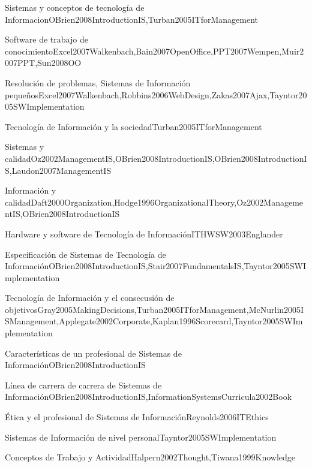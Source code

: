 \begin{LU1}{Sistemas y conceptos de tecnología de Informacion}{OBrien2008IntroductionIS,Turban2005ITforManagement}{}
\begin{LU2}{Software de trabajo de conocimiento}{Excel2007Walkenbach,Bain2007OpenOffice,PPT2007Wempen,Muir2007PPT,Sun2008OO}{}
\begin{LU3}{Resolución de problemas, Sistemas de Información pequeños}{Excel2007Walkenbach,Robbins2006WebDesign,Zakas2007Ajax,Tayntor2005SWImplementation}{}
\begin{LU4}{Tecnología de Información y la sociedad}{Turban2005ITforManagement}{}
\begin{LU5}{Sistemas y calidad}{Oz2002ManagementIS,OBrien2008IntroductionIS,OBrien2008IntroductionIS,Laudon2007ManagementIS}{}
\begin{LU6}{Información y calidad}{Daft2000Organization,Hodge1996OrganizationalTheory,Oz2002ManagementIS,OBrien2008IntroductionIS}{}
\begin{LU7}{Hardware y software de Tecnología de Información}{ITHWSW2003Englander}{}
\begin{LU8}{Especificación de Sistemas de Tecnología de Información}{OBrien2008IntroductionIS,Stair2007FundamentalsIS,Tayntor2005SWImplementation}{}
\begin{LU9}{Tecnología de Información y el consecusión de objetivos}{Gray2005MakingDecisions,Turban2005ITforManagement,McNurlin2005ISManagement,Applegate2002Corporate,Kaplan1996Scorecard,Tayntor2005SWImplementation}{}
\begin{LU10}{Características de un profesional de Sistemas de Información}{OBrien2008IntroductionIS}{}
\begin{LU11}{Línea de carrera de carrera de Sistemas de Información}{OBrien2008IntroductionIS,InformationSystemsCurricula2002Book}{}
\begin{LU12}{Ética y el profesional de Sistemas de Información}{Reynolds2006ITEthics}{}
\begin{LU13}{Sistemas de Información de nivel personal}{Tayntor2005SWImplementation}{}
\begin{LU13.01}[LU13]{Conceptos de Trabajo y Actividad}{Halpern2002Thought,Tiwana1999Knowledge}{}
\end{LU13.01}
\end{LU13}
\end{LU12}
\end{LU11}
\end{LU10}
\end{LU9}
\end{LU8}
\end{LU7}
\end{LU6}
\end{LU5}
\end{LU4}
\end{LU3}
\end{LU2}
\end{LU1}
